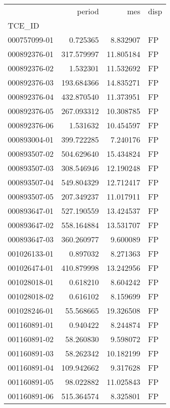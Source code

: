\begin{tabular}{lrrl}
\toprule
{} &      period &          mes & disp \\
TCE\_ID       &             &              &      \\
\midrule
000757099-01 &    0.725365 &     8.832907 &   FP \\
000892376-01 &  317.579997 &    11.805184 &   FP \\
000892376-02 &    1.532301 &    11.532692 &   FP \\
000892376-03 &  193.684366 &    14.835271 &   FP \\
000892376-04 &  432.870540 &    11.373951 &   FP \\
000892376-05 &  267.093312 &    10.308785 &   FP \\
000892376-06 &    1.531632 &    10.454597 &   FP \\
000893004-01 &  399.722285 &     7.240176 &   FP \\
000893507-02 &  504.629640 &    15.434824 &   FP \\
000893507-03 &  308.546946 &    12.190248 &   FP \\
000893507-04 &  549.804329 &    12.712417 &   FP \\
000893507-05 &  207.349237 &    11.017911 &   FP \\
000893647-01 &  527.190559 &    13.424537 &   FP \\
000893647-02 &  558.164884 &    13.531707 &   FP \\
000893647-03 &  360.260977 &     9.600089 &   FP \\
001026133-01 &    0.897032 &     8.271363 &   FP \\
001026474-01 &  410.879998 &    13.242956 &   FP \\
001028018-01 &    0.618210 &     8.604242 &   FP \\
001028018-02 &    0.616102 &     8.159699 &   FP \\
001028246-01 &   55.568665 &    19.326508 &   FP \\
001160891-01 &    0.940422 &     8.244874 &   FP \\
001160891-02 &   58.260830 &     9.598072 &   FP \\
001160891-03 &   58.262342 &    10.182199 &   FP \\
001160891-04 &  109.942662 &     9.317628 &   FP \\
001160891-05 &   98.022882 &    11.025843 &   FP \\
001160891-06 &  515.364574 &     8.325801 &   FP \\

\end{tabular}
